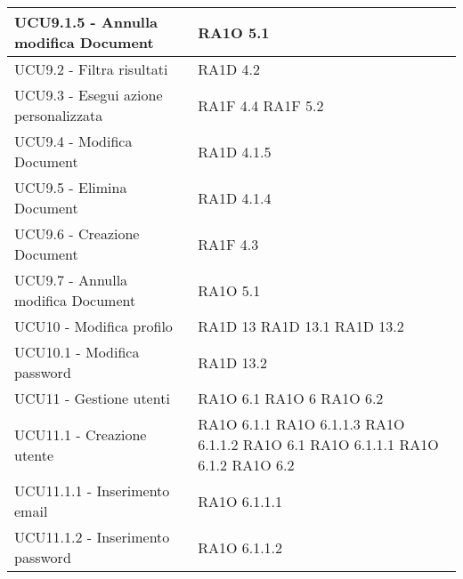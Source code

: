 \begin{center}
\begin{longtable}{ | p{5cm} | p{5cm} |}
            UCU9.1.5 - Annulla modifica Document &  RA1O 5.1 \newline  \\ \hline      
            UCU9.2 - Filtra risultati &  RA1D 4.2  \newline  \\ \hline      
            UCU9.3 - Esegui azione personalizzata &  RA1F 4.4 \newline  RA1F 5.2 \newline  \\ \hline      
            UCU9.4 - Modifica Document &  RA1D 4.1.5 \newline  \\ \hline      
            UCU9.5 - Elimina Document &  RA1D 4.1.4  \newline  \\ \hline      
            UCU9.6 - Creazione Document &  RA1F 4.3 \newline  \\ \hline      
            UCU9.7 - Annulla modifica Document &  RA1O 5.1 \newline  \\ \hline      
            UCU10 - Modifica profilo &  RA1D 13 \newline  RA1D 13.1 \newline  RA1D 13.2 \newline  \\ \hline      
            UCU10.1 - Modifica password &  RA1D 13.2 \newline  \\ \hline      
            UCU11 - Gestione utenti &  RA1O 6.1  \newline  RA1O 6 \newline  RA1O 6.2  \newline  \\ \hline      
            UCU11.1 - Creazione utente &  RA1O 6.1.1  \newline  RA1O 6.1.1.3  \newline  RA1O 6.1.1.2 \newline  RA1O 6.1  \newline  RA1O 6.1.1.1  \newline  RA1O 6.1.2  \newline  RA1O 6.2  \newline  \\ \hline      
            UCU11.1.1 - Inserimento email &  RA1O 6.1.1.1  \newline  \\ \hline      
            UCU11.1.2 - Inserimento password &  RA1O 6.1.1.2 \newline  \\ \hline      

\end{longtable}
\end{center}
